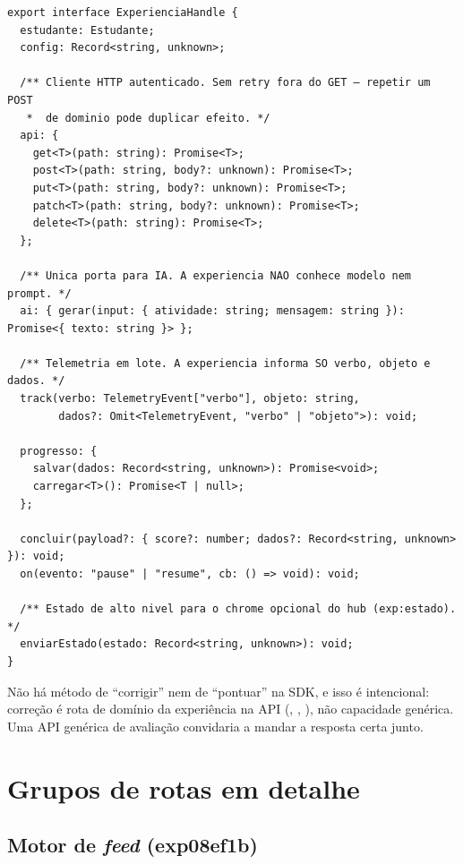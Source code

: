 \begin{lstlisting}[language=tsunoo, caption={\cd{ExperienciaHandle} --- tudo que a experiência pode fazer}, label={lst:handle}]
export interface ExperienciaHandle {
  estudante: Estudante;
  config: Record<string, unknown>;

  /** Cliente HTTP autenticado. Sem retry fora do GET — repetir um POST
   *  de dominio pode duplicar efeito. */
  api: {
    get<T>(path: string): Promise<T>;
    post<T>(path: string, body?: unknown): Promise<T>;
    put<T>(path: string, body?: unknown): Promise<T>;
    patch<T>(path: string, body?: unknown): Promise<T>;
    delete<T>(path: string): Promise<T>;
  };

  /** Unica porta para IA. A experiencia NAO conhece modelo nem prompt. */
  ai: { gerar(input: { atividade: string; mensagem: string }): Promise<{ texto: string }> };

  /** Telemetria em lote. A experiencia informa SO verbo, objeto e dados. */
  track(verbo: TelemetryEvent["verbo"], objeto: string,
        dados?: Omit<TelemetryEvent, "verbo" | "objeto">): void;

  progresso: {
    salvar(dados: Record<string, unknown>): Promise<void>;
    carregar<T>(): Promise<T | null>;
  };

  concluir(payload?: { score?: number; dados?: Record<string, unknown> }): void;
  on(evento: "pause" | "resume", cb: () => void): void;

  /** Estado de alto nivel para o chrome opcional do hub (exp:estado). */
  enviarEstado(estado: Record<string, unknown>): void;
}
\end{lstlisting}

\begin{nota}
Não há método de \enquote{corrigir} nem de \enquote{pontuar} na SDK, e isso é
intencional: correção é rota de domínio da experiência na API
(, , ), não capacidade genérica. Uma
API genérica de avaliação convidaria a mandar a resposta certa junto.
\end{nota}

\section{Grupos de rotas em detalhe}

\subsection{Motor de \emph{feed} (exp08ef1b)}

